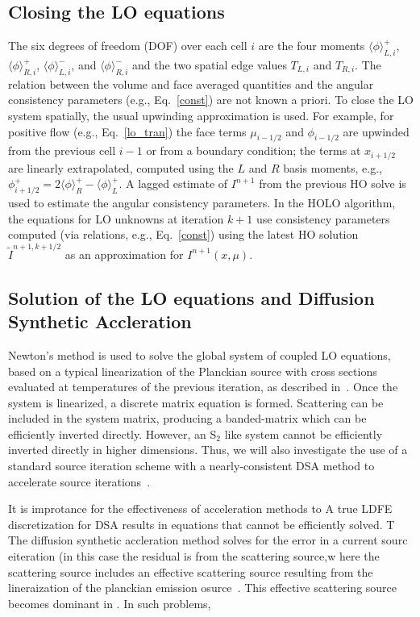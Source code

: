 \documentclass[11pt]{article}
\newcommand{\mom}[1]{\langle #1 \rangle}
\begin{document}
\subsection{Closing the LO equations}

The six degrees of freedom (DOF) over each cell $i$ are the four moments $\mom{\phi}_{L,i}^+$,
$\mom{\phi}_{R,i}^+$, $\mom{\phi}_{L,i}^-$, and $\mom{\phi}_{R,i}^-$ and the two
spatial edge values $T_{L,i}$ and $T_{R,i}$. The relation between the volume and face averaged quantities and the angular consistency parameters (e.g., Eq.~\eqref{const}) are not known a priori. 
To close the LO system spatially, the usual upwinding
approximation is used.  For example, for positive flow (e.g., Eq.~\eqref{lo_tran}) the face terms $\mu_{i-1/2}$ and $\phi_{i-1/2}$
are upwinded from the previous cell $i-1$ or from a boundary condition; the terms
at $x_{i+1/2}$ are linearly extrapolated, computed using the $L$ and $R$ basis
moments, e.g., $\phi^+_{i+1/2} = 2\mom{\phi}_R^+ - \mom{\phi}_L^+$. 
A lagged estimate of $I^{n+1}$ from the previous HO solve is
used to estimate the angular consistency parameters. In the HOLO algorithm, the equations for LO unknowns at iteration $k+1$ use consistency parameters
computed (via relations, e.g., Eq.~\eqref{const}) using the latest HO solution $\tilde{I}^{n+1,k+1/2}$
as an approximation for $I^{n+1}(x,\mu)$. 


\subsection{Solution of the LO equations and Diffusion Synthetic Accleration}

Newton's method is used to solve the global system of coupled LO
equations, based on a typical linearization of the Planckian source with cross
sections evaluated at temperatures of the previous iteration, as described
in~\cite{morel_newton}. 
Once the system is linearized, a discrete matrix equation is formed.  Scattering can
be included in the system matrix, producing a banded-matrix which can be efficiently
inverted directly.  However, an S$_2$ like system cannot be efficiently inverted
directly in higher dimensions.  Thus, we will also investigate the use of a standard
source iteration scheme with a nearly-consistent DSA method to accelerate source
iterations~\cite{wla}.

It is improtance for the effectiveness of acceleration methods to 
A true LDFE discretization for DSA results in equations that cannot be efficiently
solved.  T
The diffusion synthetic accleration method solves for the error in a current sourc
eiteration (in this case the residual is from the scattering source,w here the
scattering source includes an effective scattering source resulting from the
lineraization of the planckian emission osurce~\cite{morel_newton}.  This effective
scattering source becomes dominant in .  In such problems, 
\end{document}
